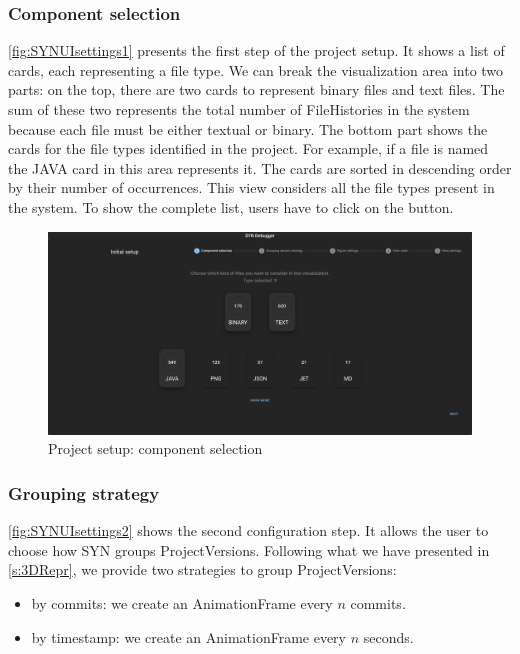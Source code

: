 \subsubsection*{Component selection}
\autoref{fig:SYNUIsettings1} presents the first step of the project setup. It shows a list of cards, each representing a file type. 
We can break the visualization area into two parts: on the top, there are two cards to represent binary files and text files. 
The sum of these two represents the total number of FileHistories in the system because each file must be either textual or binary. 
The bottom part shows the cards for the file types identified in the project. For example, if a file is named  the JAVA card in this area represents it. 
The cards are sorted in descending order by their number of occurrences. This view considers all the file types present in the system. To show the complete list, users have to click on the  button.

\begin{figure}
    \center
    \includegraphics[width=\textwidth]{SYNUI-settings1.png}
    \caption{Project setup: component selection}
    \label{fig:SYNUIsettings1}
\end{figure}


\subsubsection*{Grouping strategy}
\autoref{fig:SYNUIsettings2} shows the second configuration step. It allows the user to choose how SYN groups ProjectVersions. 
Following what we have presented in \autoref{s:3DRepr}, we provide two strategies to group ProjectVersions:
\begin{itemize}
    \item by commits: we create an AnimationFrame every $n$ commits. 
    \item by timestamp: we create an AnimationFrame every $n$ seconds. 
\end{itemize}

